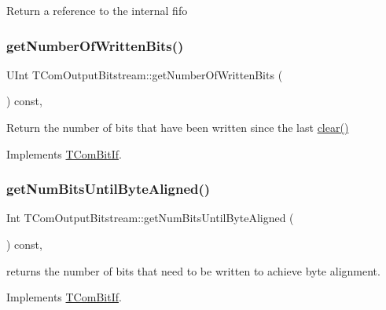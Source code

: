Return a reference to the internal fifo \mbox{\label{class_t_com_output_bitstream_a6adef3de1456ef6b024fcd432aa781fc}} 
\subsubsection{\texorpdfstring{get\+Number\+Of\+Written\+Bits()}{getNumberOfWrittenBits()}}
{\footnotesize\ttfamily U\+Int T\+Com\+Output\+Bitstream\+::get\+Number\+Of\+Written\+Bits (\begin{DoxyParamCaption}{ }\end{DoxyParamCaption}) const\hspace{0.3cm}{\ttfamily [inline]}, {\ttfamily [virtual]}}

Return the number of bits that have been written since the last \hyperlink{class_t_com_output_bitstream_a7eef394424aa099a7e93a184163620de}{clear()} 

Implements \hyperlink{class_t_com_bit_if}{T\+Com\+Bit\+If}.

\mbox{\label{class_t_com_output_bitstream_a1c5b3ca146b4c2828f2fde6a89bd8bf1}} 
\subsubsection{\texorpdfstring{get\+Num\+Bits\+Until\+Byte\+Aligned()}{getNumBitsUntilByteAligned()}}
{\footnotesize\ttfamily Int T\+Com\+Output\+Bitstream\+::get\+Num\+Bits\+Until\+Byte\+Aligned (\begin{DoxyParamCaption}{ }\end{DoxyParamCaption}) const\hspace{0.3cm}{\ttfamily [inline]}, {\ttfamily [virtual]}}

returns the number of bits that need to be written to achieve byte alignment. 

Implements \hyperlink{class_t_com_bit_if}{T\+Com\+Bit\+If}.

